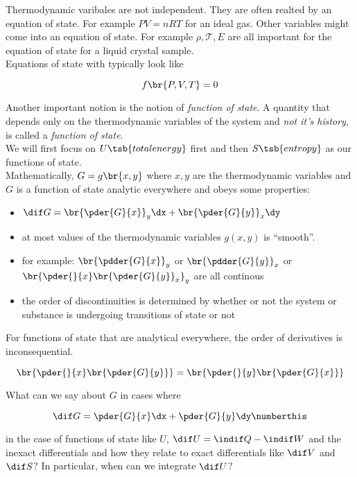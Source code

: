 \documentclass{article}
\begin{document}
Thermodynamic varibales are not independent. They are often realted by an equation of state. For example $PV = nRT$ for an ideal gas. Other variables might come into an equation of state. For example $\rho, \mathcal{T}, E$ are all important for the equation of state for a liquid crystal sample. \\

Equations of state with typically look like

\[ f\br{P, V, T} = 0 \]

Another important notion is the notion of \textit{function of state}. A quantity that depends only on the thermodynamic variables of the system and \textit{not it's history}, is called a \textit{function of state}. \\

We will first focus on $U\tsb{total energy}$ first and then $S\tsb{entropy}$ as our functions of state. \\

Mathematically, $G = g\br{x,y}$ where $x,y$ are the thermodynamic variables and $G$ is a function of state analytic everywhere and obeys some properties:

\begin{itemize}
    \item $\dif G = \br{\pder{G}{x}}_y \dx + \br{\pder{G}{y}}_x \dy $
    \item at most values of the thermodynamic variables $g(x,y)$ is ``smooth''.
    \item for example: $\br{\pdder{G}{x}}_y$ or $\br{\pdder{G}{y}}_x$ or $\br{\pder{}{x}\br{\pder{G}{y}}_x}_y$ are all continous
    \item the order of discontinuities is determined by whether or not the system or substance is undergoing transitions of state or not
\end{itemize}

For functions of state that are analytical everywhere, the order of derivatives is inconsequential.

\[ \br{\pder{}{x}\br{\pder{G}{y}}} = \br{\pder{}{y}\br{\pder{G}{x}}}\]

What can we say about $G$ in cases where

\[ \dif G = \pder{G}{x} \dx + \pder{G}{y} \dy \numberthis \label{eq:dg} \]

in the case of functions of state like $U$, $ \dif U = \indif Q - \indif W  $ and the inexact differentials and how they relate to exact differentials like $\dif V$ and $\dif S$? In particular, when can we integrate $\dif U$?
\end{document}
